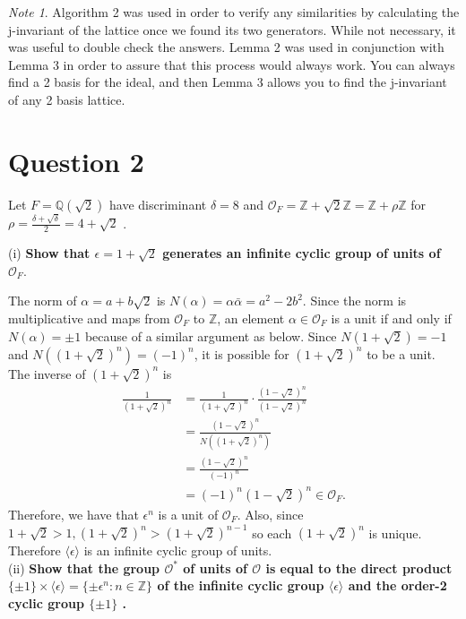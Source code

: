 \documentclass[12pt]{amsart}
\theoremstyle{definition}
\theoremstyle{remark}
\newtheorem*{note}{Note}
\begin{document}
\begin{note}
    Algorithm 2 was used in order to verify any similarities by calculating the j-invariant of the lattice once we found its two generators. While not necessary, it was useful to double check the answers. Lemma 2 was used in conjunction with Lemma 3 in order to assure that this process would always work. You can always find a 2 basis for the ideal, and then Lemma 3 allows you to find the j-invariant of any 2 basis lattice.
\end{note}

\section*{Question 2}
Let $F = \mathbb{Q}(\sqrt{2})$ have discriminant $\delta = 8$ and $\mathcal{O}_F = \mathbb{Z} + \sqrt{2}\mathbb{Z} = \mathbb{Z} + \rho\mathbb{Z}$ for $\rho = \frac{\delta + \sqrt{\delta}}{2} = 4+\sqrt{2}$ .

\qquad(i) \textbf{Show that $\epsilon = 1 + \sqrt{2}$ generates an infinite cyclic group of units of $\mathcal{O}_F$}.

The norm of $\alpha = a + b\sqrt{2}$ is $N(\alpha) = \alpha\bar{\alpha} = a^2-2b^2$. Since the norm is multiplicative and maps from $\mathcal{O}_F$ to $\mathbb{Z}$, an element $\alpha \in \mathcal{O}_F$ is a unit if and only if $N(\alpha) = \pm 1$ because of a similar argument as below. Since $N(1+\sqrt{2}) = -1$ and $N((1+\sqrt{2})^n) = (-1)^n$, it is possible for $(1+\sqrt{2})^n$ to be a unit. The inverse of $(1+\sqrt{2})^n$ is 
\begin{align*}
    \frac{1}{(1+\sqrt{2})^n} &= \frac{1}{(1+\sqrt{2})^n}\cdot \frac{(1-\sqrt{2})^n}{(1-\sqrt{2})^n}\\
    &= \frac{(1-\sqrt{2})^n}{N((1+\sqrt{2})^n)}\\
    &= \frac{(1-\sqrt{2})^n}{(-1)^n}\\
    &= (-1)^n(1-\sqrt{2})^n \in \mathcal{O}_F.
\end{align*}
Therefore, we have that $\epsilon^n$ is a unit of $\mathcal{O}_F$. Also, since $1+\sqrt{2} > 1, (1+\sqrt{2})^n > (1+\sqrt{2})^{n-1}$ so each $(1+\sqrt{2})^n$ is unique. Therefore $\langle \epsilon \rangle$ is an infinite cyclic group of units.\\

\qquad(ii) \textbf{Show that the group $\mathcal{O}^*$ of units of $\mathcal{O}$ is equal to the direct product $\{\pm 1\}\times \langle \epsilon \rangle = \{\pm \epsilon^n : n \in \mathbb{Z}\}$ of the infinite cyclic group $\langle \epsilon \rangle$ and the order-2 cyclic group $\{\pm 1\}$ .}
\end{document}
